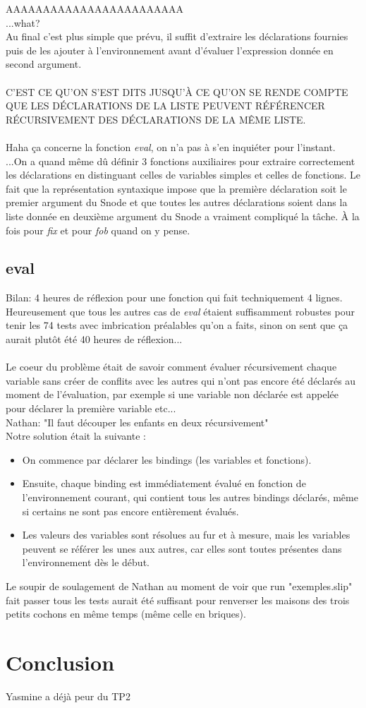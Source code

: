 \documentclass{article}
\begin{document}
AAAAAAAAAAAAAAAAAAAAAAAA \\ 
...what? \\
Au final c'est plus simple que prévu, il suffit d'extraire les déclarations fournies puis de les ajouter à l'environnement avant d'évaluer l'expression donnée en second argument.\\\\
C'EST CE QU'ON S'EST DITS JUSQU'À CE QU'ON SE RENDE COMPTE QUE LES DÉCLARATIONS DE LA LISTE PEUVENT RÉFÉRENCER RÉCURSIVEMENT DES DÉCLARATIONS DE LA MÊME LISTE. \\\\
Haha ça concerne la fonction \textit{eval}, on n'a pas à s'en inquiéter pour l'instant. \\
...On a quand même dû définir 3 fonctions auxiliaires pour extraire correctement les déclarations en distinguant celles de variables simples et celles de fonctions. Le fait que la représentation syntaxique impose que la première déclaration soit le premier argument du Snode et que toutes les autres déclarations soient dans la liste donnée en deuxième argument du Snode a vraiment compliqué la tâche. À la fois pour \textit{fix} et pour \textit{fob} quand on y pense.\\

\subsection{eval}

Bilan: 4 heures de réflexion pour une fonction qui fait techniquement 4 lignes.
Heureusement que tous les autres cas de \textit{eval} étaient suffisamment robustes pour tenir les 74 tests avec imbrication préalables qu'on a faits, sinon on sent que ça aurait plutôt été 40 heures de réflexion...\\\\
Le coeur du problème était de savoir comment évaluer récursivement chaque variable sans créer de conflits avec les autres qui n'ont pas encore été déclarés au moment de l'évaluation, par exemple si une variable non déclarée est appelée pour déclarer la première variable etc...\\
Nathan: "Il faut découper les enfants en deux récursivement"\\
Notre solution était la suivante :
\begin{itemize}
  \item On commence par déclarer les bindings (les variables et fonctions).
  \item Ensuite, chaque binding est immédiatement évalué en fonction de l'environnement courant, qui contient tous les autres bindings déclarés, même si certains ne sont pas encore entièrement évalués.
  \item Les valeurs des variables sont résolues au fur et à mesure, mais les variables peuvent se référer les unes aux autres, car elles sont toutes présentes dans l'environnement dès le début.
\end{itemize}
Le soupir de soulagement de Nathan au moment de voir que run "exemples.slip" fait passer tous les tests aurait été suffisant pour renverser les maisons des trois petits cochons en même temps (même celle en briques).

\section {Conclusion}
Yasmine a déjà peur du TP2
\end{document}
